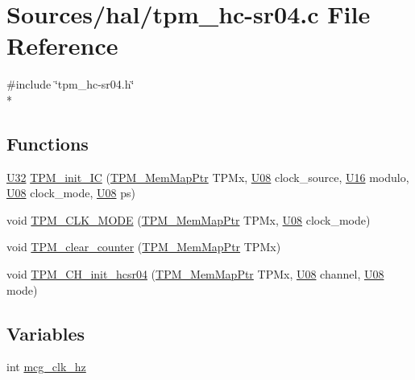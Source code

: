 \hypertarget{tpm__hc-sr04_8c}{}\section{Sources/hal/tpm\+\_\+hc-\/sr04.c File Reference}
\label{tpm__hc-sr04_8c}
{\ttfamily \#include \char`\"{}tpm\+\_\+hc-\/sr04.\+h\char`\"{}}\\*
\subsection*{Functions}
\begin{DoxyCompactItemize}
\item 
\hyperlink{_types_8h_a811024d35b9b8a41095b1f583b649e56}{U32} \hyperlink{tpm__hc-sr04_8c_a1e776e3466a943f1d4b317f052e18068}{T\+P\+M\+\_\+init\+\_\+\+IC} (\hyperlink{group___t_p_m___peripheral_ga32147338cedc9904efff0d19b3a358ac}{T\+P\+M\+\_\+\+Mem\+Map\+Ptr} T\+P\+Mx, \hyperlink{_types_8h_a3fd534ebc238a0e487b81bda78811de6}{U08} clock\+\_\+source, \hyperlink{_types_8h_adf928e51a60dba0df29d615401cc55a8}{U16} modulo, \hyperlink{_types_8h_a3fd534ebc238a0e487b81bda78811de6}{U08} clock\+\_\+mode, \hyperlink{_types_8h_a3fd534ebc238a0e487b81bda78811de6}{U08} ps)
\item 
void \hyperlink{tpm__hc-sr04_8c_abf0978ac5f9b9ca8dd0f83c17dd2e483}{T\+P\+M\+\_\+\+C\+L\+K\+\_\+\+M\+O\+DE} (\hyperlink{group___t_p_m___peripheral_ga32147338cedc9904efff0d19b3a358ac}{T\+P\+M\+\_\+\+Mem\+Map\+Ptr} T\+P\+Mx, \hyperlink{_types_8h_a3fd534ebc238a0e487b81bda78811de6}{U08} clock\+\_\+mode)
\item 
void \hyperlink{tpm__hc-sr04_8c_add8fad7433fe594968683eb87d6c4469}{T\+P\+M\+\_\+clear\+\_\+counter} (\hyperlink{group___t_p_m___peripheral_ga32147338cedc9904efff0d19b3a358ac}{T\+P\+M\+\_\+\+Mem\+Map\+Ptr} T\+P\+Mx)
\item 
void \hyperlink{tpm__hc-sr04_8c_add9b5ccc1a966f818d2ba4d3961b2688}{T\+P\+M\+\_\+\+C\+H\+\_\+init\+\_\+hcsr04} (\hyperlink{group___t_p_m___peripheral_ga32147338cedc9904efff0d19b3a358ac}{T\+P\+M\+\_\+\+Mem\+Map\+Ptr} T\+P\+Mx, \hyperlink{_types_8h_a3fd534ebc238a0e487b81bda78811de6}{U08} channel, \hyperlink{_types_8h_a3fd534ebc238a0e487b81bda78811de6}{U08} mode)
\end{DoxyCompactItemize}
\subsection*{Variables}
\begin{DoxyCompactItemize}
\item 
int \hyperlink{tpm__hc-sr04_8c_a5383539a3a607e05906f71be0fd4f4af}{mcg\+\_\+clk\+\_\+hz}
\end{DoxyCompactItemize}


